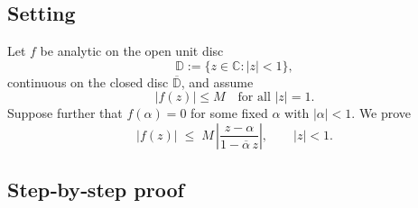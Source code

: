 \documentclass[12pt]{article}
\theoremstyle{definition} %
\theoremstyle{plain} %
\begin{document}
\subsection*{Setting}

Let $f$ be analytic on the open unit disc
\[
   \mathbb D:=\{z\in\mathbb C:|z|<1\},
\]
continuous on the closed disc $\overline{\mathbb D}$, and assume
\[
   |f(z)|\le M\quad\text{for all }|z|=1.
\]
Suppose further that $f(\alpha)=0$ for some fixed $\alpha$ with $|\alpha|<1$.
We prove
\[
   |f(z)|
   \;\le\;
   M\,
   \left|\frac{z-\alpha}{1-\overline{\alpha}\,z}\right|,
   \qquad |z|<1. \tag{$\ast$}
\]

\subsection*{Step‑by‑step proof}
\end{document}
